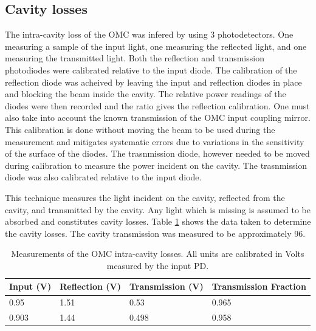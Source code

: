 \subsection{Cavity losses}
The intra-cavity loss of the OMC was infered by using 3 photodetectors. %
One measuring a sample of the input light, one measuring the reflected light, and one measuring the transmitted light. %
Both the reflection and transmission photodiodes were calibrated relative to the input diode. %
 The calibration of the reflection diode was acheived by leaving the input and reflection diodes in place and blocking the beam inside the cavity. %
The relative power readings of the diodes were then recorded and the ratio gives the reflection calibration. %
One must also take into account the known transmission of the OMC input coupling mirror. %
This calibration is done without moving the beam to be used during the measurement and mitigates systematic errors due to variations in the sensitivity of the surface of the diodes. %
The trasnmission diode, however needed to be moved during calibration to measure the power incident on the cavity. %
The trasnmission diode was also calibrated relative to the input diode.

This technique measures the light incident on the cavity, reflected from the cavity, and transmitted by the cavity. %
Any light which is missing is assumed to be absorbed and constitutes cavity losses. %
Table \ref{tab:lossmeas} shows the data taken to determine the cavity losses. %
 The cavity transmission was measured to be approximately 96\perc{}.

\begin{table}
  \begin{center}
    \begin{tabular}{lll|l}
      \hline
      Input (V) & Reflection (V) & Transmission (V) & Transmission Fraction \\
      \hline
      0.95 & 1.51 & 0.53 & 0.965 \\
      0.903 & 1.44 &0.498 & 0.958\\
      \hline
    \end{tabular}
  \caption[Measurements of the OMC intra-cavity losses.]{Measurements of the OMC intra-cavity losses. All units are calibrated in Volts measured by the input PD.}
  \label{tab:lossmeas}
  \end{center}
\end{table}


